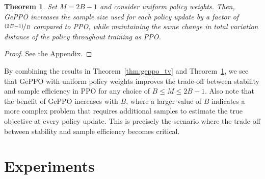 \documentclass{article}
\newtheorem{theorem}{Theorem}
\begin{document}
\begin{theorem}\label{thm:geppo_ess}
Set $M = 2B-1$ and consider uniform policy weights. Then, GePPO increases the sample size used for each policy update by a factor of $\nicefrac{(2B-1)}{B}$ compared to PPO, while maintaining the same change in total variation distance of the policy throughout training as PPO.
\end{theorem}
\begin{proof}
See the Appendix.
\end{proof}

By combining the results in Theorem~\ref{thm:geppo_tv} and Theorem~\ref{thm:geppo_ess}, we see that GePPO with uniform policy weights improves the trade-off between stability and sample efficiency in PPO for any choice of $B \leq M \leq 2B-1$. Also note that the benefit of GePPO increases with $B$, where a larger value of $B$ indicates a more complex problem that requires additional samples to estimate the true objective at every policy update. This is precisely the scenario where the trade-off between stability and sample efficiency becomes critical.


\section{Experiments}\label{sec:experiments}
\end{document}
